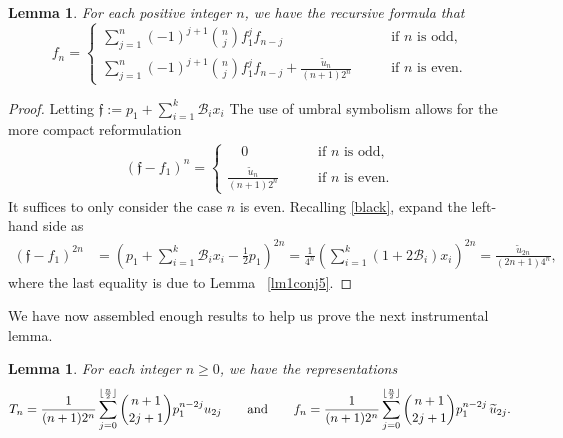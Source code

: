 \documentclass[11pt]{amsart}
\newtheorem{lemma}[theorem]{Lemma}
\theoremstyle{definition}
\theoremstyle{remark}
\numberwithin{equation}{section}
\begin{document}
\begin{lemma} \label{lm2conj5} For each positive integer $n$, we have the recursive formula that
$$f_n =  \begin{cases}  \sum_{j=1}^n (-1)^{j+1} \binom{n}j  f_1^j f_{n-j} \qquad & \text{if $n$ is odd}, \\
\sum_{j=1}^n (-1)^{j+1} \binom{n}j  f_1^j f_{n-j} + \frac{\widetilde{u}_n}{(n+1)2^n} \qquad & \text{if $n$ is even}. \end{cases}
$$
\end{lemma}


\begin{proof} Letting $\mathfrak{f}:=p_1+\sum_{i=1}^k\mathcal{B}_ix_i$ The use of umbral symbolism allows for the more compact reformulation
\begin{align} \label{f_umbral} (\mathfrak{f}-f_1)^n =  \begin{cases} \,\,\,\,\,\, 0 \qquad & \text{if $n$ is odd}, \\  \frac{\widetilde{u}_n}{(n+1)2^n} \qquad & \text{if $n$ is even}. \end{cases}
\end{align}
It suffices to only consider the case $n$ is even. Recalling  \eqref{black}, expand the left-hand side as
\begin{align*}
(\mathfrak{f}-f_1)^{2n} & = \left(p_1+\sum_{i=1}^k\mathcal{B}_ix_i -\frac12p_1\right)^{2n} = \frac1{4^n}\left(\sum_{i=1}^k (1+2\mathcal{B}_i)x_i \right)^{2n}
= \frac{\widetilde{u}_{2n}}{(2n+1)4^n},
\end{align*}
where the last equality is due to Lemma ~\ref{lm1conj5}.
\end{proof}


We have now assembled enough results to help us prove the next instrumental lemma.

\begin{lemma}  \label{conj5} For each integer $n\geq0$, we have the representations 
$$T_n=\frac1{(n+1)2^n} \sum_{j=0}^{\lfloor\frac{n}2\rfloor} \binom{n+1}{2j+1} p_1^{n-2j} 
u_{2j} \qquad \text{{\rm and}} \qquad
f_n=\frac1{(n+1)2^n} \sum_{j=0}^{\lfloor\frac{n}2\rfloor} \binom{n+1}{2j+1} p_1^{n-2j}\, \widetilde{u}_{2j}.$$
\end{lemma}
\end{document}
